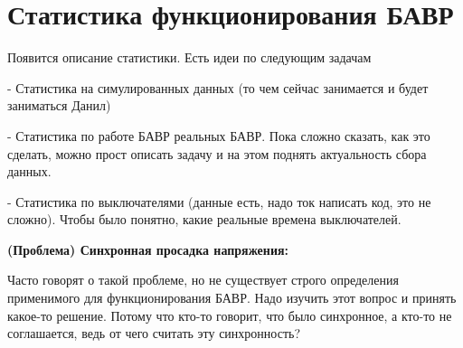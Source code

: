 
\section{Статистика функционирования БАВР}\label{sec:ch1_statistics}

Появится описание статистики. Есть идеи по следующим задачам\par\vspace{0.2cm}

- Статистика на симулированных данных (то чем сейчас занимается и будет заниматься Данил)\par\vspace{0.2cm}

- Статистика по работе БАВР реальных БАВР. Пока сложно сказать, как это сделать, можно прост описать задачу и на этом поднять актуальность сбора данных.\par\vspace{0.2cm}

- Статистика по выключателями (данные есть, надо ток написать код, это не сложно). Чтобы было понятно, какие реальные времена выключателей.\par\vspace{0.2cm}

\par\vspace{0.2cm}
\noindent\textbf{(Проблема) Синхронная просадка напряжения:}\par\vspace{0.2cm}

Часто говорят о такой проблеме, но не существует строго определения применимого для
функционирования БАВР. Надо изучить этот вопрос и принять какое-то решение. Потому что
кто-то говорит, что было синхронное, а кто-то не соглашается, ведь от чего считать эту
синхронность?\par\vspace{0.2cm}

